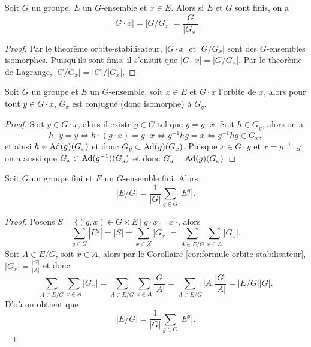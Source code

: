 \begin{corollary}
	\label{cor:formule-orbite-stabilisateur}
	Soit $G$ un groupe, $E$ un $G$-ensemble et $x \in E$.
	Alors si $E$ et $G$ sont finis, on a
	\begin{equation*}
		|G \cdot x| = |G/G_x| = \frac{|G|}{|G_x|}
	\end{equation*}
\end{corollary}

\begin{proof}
	Par le theorème orbite-stabilisateur, $|G \cdot x|$ et $|G/G_x|$
	sont des $G$-ensembles isomorphes. Puisqu'ils sont finis,
	il s'ensuit que $|G \cdot x| = |G/G_x|$.
	Par le theorème de Lagrange, $|G/G_x| = |G|/|G_x|$.
\end{proof}

\begin{proposition}
	Soit $G$ un groupe et $E$ un $G$-ensemble, soit $x \in E$ et
	$G \cdot x$ l'orbite de $x$, alors pour tout $y \in G \cdot x$,
	$G_x$ est conjugué (donc isomorphe) à $G_y$.
\end{proposition}

\begin{proof}
	Soit $y \in G \cdot x$, alors il existe $g \in G$ tel que $y = g \cdot x$.
	Soit $h \in G_y$, alors on a
	\begin{equation*}
		h \cdot y = y \iff h \cdot (g \cdot x) = g \cdot x \iff
		g^{-1} h g = x \iff g^{-1} h g \in G_x,
	\end{equation*}
	et ainsi $h \in \operatorname{Ad}(g)(G_x)$ et donc $G_y \subset \operatorname{Ad}(g)(G_x)$.
	Puisque $x \in G \cdot y$ et $x = g^{-1} \cdot y$ on a 
	aussi que $G_x \subset \operatorname{Ad}(g^{-1})(G_y)$ et donc $G_y = \operatorname{Ad}(g)(G_x)$
\end{proof}

\begin{theorem}
	Soit $G$ un groupe fini et $E$ un $G$-ensemble fini. Alors
	\begin{equation*}
		|E/G| = \frac{1}{|G|}\sum_{g \in G}|E^g|.
	\end{equation*}
\end{theorem}

\begin{proof}
	Posons $S = \{(g, x) \in G \times E\ |\ g \cdot x = x\}$, alors
	\begin{equation*}
		\sum_{g \in G} |E^g| = |S| = 
		\sum_{x \in X} |G_x| = \sum_{A \in E/G} \sum_{x \in A} |G_x|.
	\end{equation*}
	Soit $A \in E/G$, soit $x \in A$, alors par le Corollaire
	\ref{cor:formule-orbite-stabilisateur}, $|G_x| = \frac{|G|}{|A|}$ et donc
	\begin{equation*}
		\sum_{A \in E/G} \sum_{x \in A} |G_x| = \sum_{A \in E/G} \sum_{x \in A}\frac{|G|}{|A|}
		= \sum_{A \in E/G} |A|\frac{|G|}{|A|} = |E/G||G|.
	\end{equation*}
	D'où on obtient que
	\begin{equation*}
		|E/G| = \frac{1}{|G|}\sum_{g \in G}|E^g|.
	\end{equation*}
\end{proof}

